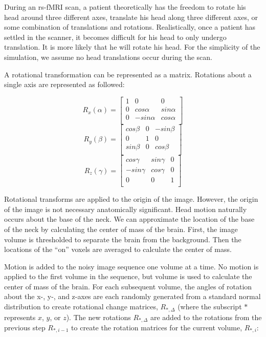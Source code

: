 During an rs-fMRI scan, a patient theoretically has the freedom to rotate his head around three different axes, translate his head along three different axes, or some combination of translations and rotations. Realistically, once a patient has settled in the scanner, it becomes difficult for his head to only undergo translation. It is more likely that he will rotate his head. For the simplicity of the simulation, we assume no head translations occur during the scan.

A rotational transformation can be represented as a matrix. Rotations about a single axis are represented as followed:

\begin{equation}
R_x(\alpha) = \begin{bmatrix}
 1 &  0          & 0     \\ 
 0 &  cos\alpha  & sin\alpha \\ 
 0 &  -sin\alpha & cos\alpha \\ 
\end{bmatrix}
\end{equation}
\begin{equation}
R_y(\beta) = \begin{bmatrix}
 cos\beta &  0 & -sin\beta \\ 
 0        &  1 & 0         \\ 
 sin\beta &  0 & cos\beta  \\ 
\end{bmatrix}
\end{equation}
\begin{equation}
R_z(\gamma) = \begin{bmatrix}
 cos\gamma  & sin\gamma  & 0 \\ 
 -sin\gamma & cos\gamma  & 0 \\ 
 0          & 0          & 1 \\ 
\end{bmatrix}
\end{equation}

Rotational transforms are applied to the origin of the image. However, the origin of the image is not necessary anatomically significant. Head motion naturally occurs about the base of the neck. We can approximate the location of the base of the neck by calculating the center of mass of the brain. First, the image volume is thresholded to separate the brain from the background. Then the locations of the ``on'' voxels are averaged to calculate the center of mass. 

Motion is added to the noisy image sequence one volume at a time. No motion is applied to the first volume in the sequence, but volume is used to calculate the center of mass of the brain. For each subsequent volume, the angles of rotation about the x-, y-, and z-axes are each randomly generated from a standard normal distribution to create rotational change matrices, $R_{*,\Delta}$ (where the subscript $*$ represents $x$, $y$, or $z$). The new rotations $R_{*,\Delta}$ are added to the rotations from the previous step $R_{*,i-1}$ to create the rotation matrices for the current volume, $R_{*,i}$:

